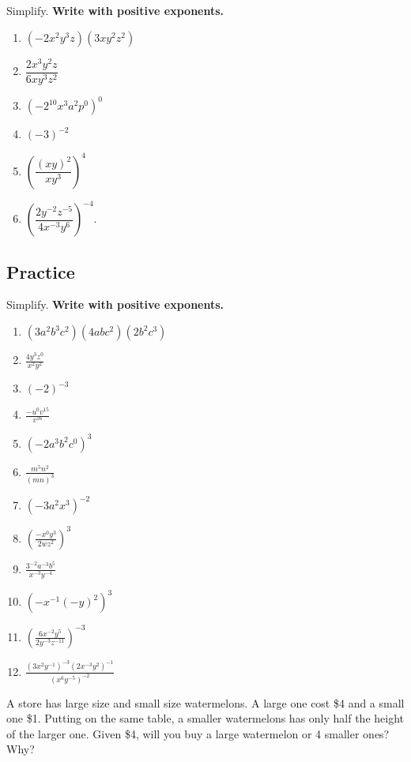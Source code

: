 \begin{example}
Simplify. \textbf{Write with positive exponents.}
\begin{enumerate}
  \item $(-2x^2y^3z)(3xy^2z^2)$
  \item $\dfrac{2x^3y^2z}{6xy^3z^2}$
  \item $(-2^{10}x^3a^2p^0)^0$
  \item $(-3)^{-2}$
  \item $\left(\dfrac{(xy)^2}{xy^3}\right)^4$
  \item $\left(\dfrac{2y^{-2}z^{-5}}{4x^{-3}y^6}\right)^{-4}.$
\end{enumerate}
\end{example}


\subsection{Practice}

\begin{exercise}
  Simplify. \textbf{Write with positive exponents.}
  
  \begin{enumerate}[label=(\arabic*)]
  \item
    \((3a^2b^3c^2)(4abc^2)(2b^2c^3)\)
  \item
    \(\frac{4y^3z^0}{x^2y^2}\)
  \item
    \((-2)^{-3}\)
  \item
    \(\frac{-u^0v^{15}}{v^{16}}\)
  \item
    \((-2a^3b^2c^0)^3\)
  \item
    \(\frac{m^5 n^{2}}{(mn)^3}\)
  \item
    \((-3a^2x^3)^{-2}\)
  \item
    \(\left(\frac{-x^0y^3}{2wz^2}\right)^3\)
  \item
    \(\frac{3^{-2}a^{-3}b^5}{x^{-3}y^{-4}}\)
  \item
    \(\left(-x^{-1}(-y)^2\right)^3\)
  \item
    \(\left(\frac{6x^{-2}y^5}{2y^{-3}z^{-11}}\right)^{-3}\)
  \item
    \(\frac{(3 x^{2} y^{-1})^{-3}(2 x^{-3} y^{2})^{-1}}{(x^{6} y^{-5})^{-2}}\)
  \end{enumerate}
\end{exercise}

\begin{exercise}
A store has large size and small size watermelons. A large one cost \$4
and a small one \$1. Putting on the same table, a smaller watermelons
has only half the height of the larger one. Given \$4, will you buy a
large watermelon or 4 smaller ones? Why?
\end{exercise}

